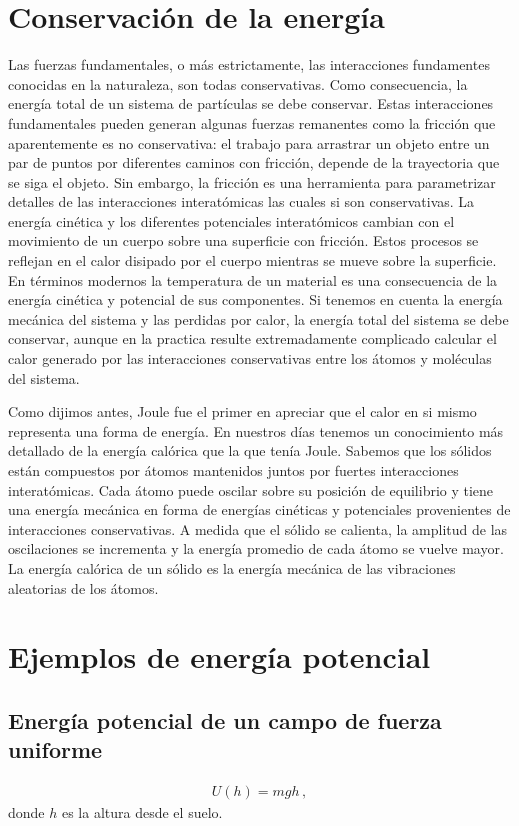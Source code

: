 \section{Conservación de la energía}
Las fuerzas fundamentales, o más estrictamente, las interacciones
fundamentes conocidas en la naturaleza, son todas conservativas. Como
consecuencia, la energía total de un sistema de partículas se debe
conservar. Estas interacciones fundamentales pueden generan algunas
fuerzas remanentes como la fricción que aparentemente es no
conservativa: el trabajo para arrastrar un objeto entre un par de
puntos por diferentes caminos con fricción, depende de la trayectoria
que se siga el objeto. Sin embargo, la fricción es una herramienta
para parametrizar detalles de las interacciones interatómicas las
cuales si son conservativas. La energía cinética y los diferentes
potenciales interatómicos cambian con el movimiento de un cuerpo sobre una
superficie con fricción. Estos procesos se reflejan en el calor
disipado por el cuerpo mientras se mueve sobre la superficie. En
términos modernos la temperatura de un material es una consecuencia
de la energía cinética y potencial de sus componentes. Si tenemos en
cuenta la energía mecánica del sistema y las perdidas por calor, la
energía total del sistema se debe conservar, aunque en la practica
resulte extremadamente complicado calcular el calor generado por las
interacciones conservativas entre los átomos y moléculas del sistema.

Como dijimos antes, Joule fue el primer en apreciar que
el calor en si mismo representa una forma de energía. 
En nuestros días tenemos un conocimiento más detallado de la energía
calórica que la que tenía Joule. Sabemos que los sólidos están
compuestos por átomos mantenidos juntos por fuertes interacciones
interatómicas. Cada átomo puede oscilar sobre su posición de
equilibrio y tiene una energía mecánica en forma de energías cinéticas
y potenciales provenientes de interacciones conservativas. A medida
que el sólido se calienta, la amplitud de las oscilaciones se
incrementa y la energía promedio de cada átomo se vuelve mayor. La
energía calórica de un sólido es la energía mecánica de las
vibraciones aleatorias de los átomos.
   

\section{Ejemplos de energía potencial}

\subsection{Energía potencial de un campo de fuerza uniforme}
\begin{align}
  U(h)=mgh\,,
\end{align}
donde $h$ es la altura desde el suelo.

